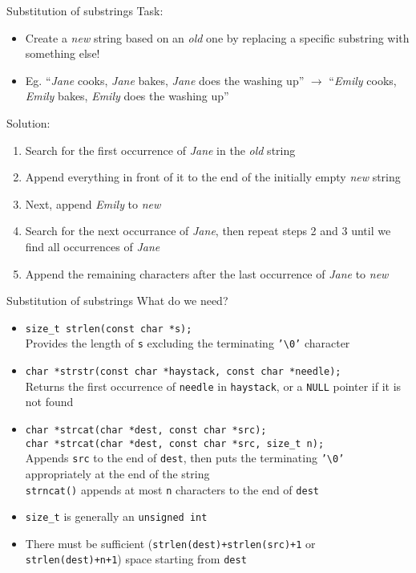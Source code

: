 \documentclass[usenames,dvipsnames,aspectratio=169]{beamer}
\begin{document}
\begin{frame}{Substitution of substrings}
  Task:
  \begin{itemize}
    \item Create a \emph{new} string based on an \emph{old} one by replacing a specific substring with something else!
    \item Eg. ``\emph{Jane} cooks, \emph{Jane} bakes, \emph{Jane} does the washing up'' $\to$ ``\emph{Emily} cooks, \emph{Emily} bakes, \emph{Emily} does the washing up''
  \end{itemize}
  Solution:
  \begin{enumerate}
    \item Search for the first occurrence of \emph{Jane} in the \emph{old} string
    \item Append everything in front of it to the end of the initially empty \emph{new} string
    \item Next, append \emph{Emily} to \emph{new}
    \item Search for the next occurrance of \emph{Jane}, then repeat steps 2 and 3 until we find all occurrences of \emph{Jane}
    \item Append the remaining characters after the last occurrence of \emph{Jane} to \emph{new}
  \end{enumerate}
\end{frame}

\begin{frame}{Substitution of substrings}
  What do we need?
  \begin{itemize}
    \small
    \item \texttt{size\_t strlen(const char *s);} \\
      Provides the length of \texttt{s} excluding the terminating \texttt{'\textbackslash0'} character
    \item \texttt{char *strstr(const char *haystack, const char *needle);} \\
      Returns the first occurrence of \texttt{needle} in \texttt{haystack}, or a \texttt{NULL} pointer if it is not found
    \item \texttt{char *strcat(char *dest, const char *src);} \\
      \texttt{char *strcat(char *dest, const char *src, size\_t n);} \\
      Appends \texttt{src} to the end of \texttt{dest}, then puts the terminating \texttt{'\textbackslash0'} appropriately at the end of the string \\
      \texttt{strncat()} appends at most \texttt{n} characters to the end of \texttt{dest}\\
    \item \texttt{size\_t} is generally an \texttt{unsigned int}
    \item There must be sufficient (\texttt{strlen(dest)+strlen(src)+1} or \texttt{strlen(dest)+n+1}) space starting from \texttt{dest}
  \end{itemize}
\end{frame}
\end{document}
